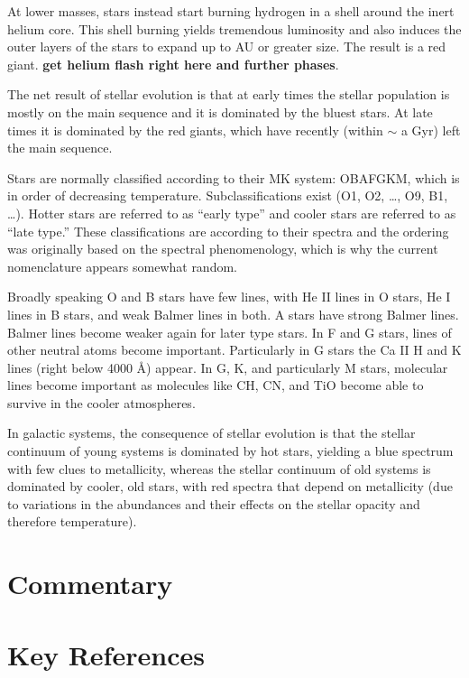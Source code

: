 At lower masses, stars instead start burning hydrogen in a shell
around the inert helium core. This shell burning yields tremendous
luminosity and also induces the outer layers of the stars to expand up
to AU or greater size. The result is a red giant. {\bf get helium
flash right here and further phases}.

The net result of stellar evolution is that at early times the stellar
population is mostly on the main sequence and it is dominated by the
bluest stars. At late times it is dominated by the red giants, which
have recently (within $\sim$ a Gyr) left the main sequence.

Stars are normally classified according to their MK system: OBAFGKM,
which is in order of decreasing temperature. Subclassifications exist
(O1, O2, \ldots, O9, B1, \ldots). Hotter stars are referred to as
``early type'' and cooler stars are referred to as ``late type.''
These classifications are according to their spectra and the ordering
was originally based on the spectral phenomenology, which is why the
current nomenclature appears somewhat random.

Broadly speaking O and B stars have few lines, with He II lines in O
stars, He I lines in B stars, and weak Balmer lines in both. A stars
have strong Balmer lines. Balmer lines become weaker again for later
type stars. In F and G stars, lines of other neutral atoms become
important. Particularly in G stars the Ca II H and K lines (right
below 4000 \AA) appear. In G, K, and particularly M stars, molecular
lines become important as molecules like CH, CN, and TiO become able
to survive in the cooler atmospheres.

In galactic systems, the consequence of stellar evolution is that the
stellar continuum of young systems is dominated by hot stars, yielding
a blue spectrum with few clues to metallicity, whereas the stellar
continuum of old systems is dominated by cooler, old stars, with red
spectra that depend on metallicity (due to variations in the
abundances and their effects on the stellar opacity and therefore
temperature). 

\section{Commentary}

\section{Key References}


